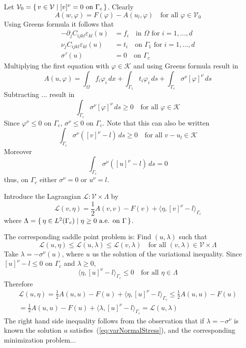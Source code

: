 \documentclass[12pt,a4paper]{article}
\numberwithin{equation}{section}
\numberwithin{table}{section}
\numberwithin{figure}{section}
\newcommand{\half}{\ensuremath{\frac{1}{2}}}
\newcommand{\pd}[1]{\ensuremath{\partial_{#1}}}
\renewcommand{\dj}{\pd{j}}
\newcommand{\V}{\ensuremath{\mathcal{V}}}
\newcommand{\K}{\ensuremath{\mathcal{K}}}
\newcommand{\Lagrange}{\ensuremath{\mathcal L}}
\newcommand{\intO}{\int_\Omega\!\!}
\newcommand{\intG}[1][0]{\int_{\Gamma_{#1}}\!\!}
\newcommand{\intGc}{\intG[c]}
\renewcommand{\epsilon}{\varepsilon}
\renewcommand{\phi}{\varphi}
\newcommand{\strain}[1][]{\ensuremath{\epsilon_{#1}}}
\newcommand{\epskl}{\strain[kl]}
\providecommand{\dualp}[2]{\langle #1, #2 \rangle}
\newcommand{\dx}{{\,dx}}
\newcommand{\ds}{{\,ds}}
\renewcommand{\forall}{\text{for all }}
\newcommand{\qforall}{\quad\text{for all }}
\begin{document}
Let $\V_0 = \set{v\in \V | [v]^\nu = 0 \text{ on }\Gamma_c}$. Clearly
\begin{equation}
  A(w,\phi) = F(\phi) - A(u_l, \phi) \quad\forall{\phi\in\V_0}
\end{equation}
Using Greens formula it follows that
\begin{align}
  \label{eq:elasteqFixedPoint}
  -\dj C_{ijkl}\epskl(u) &= f_i \quad\text{in $\Omega$ for $i=1,\ldots,d$} \\
  \nu_j C_{ijkl}\epskl(u) &= t_i \quad\text{on $\Gamma_1$ for $i=1,\ldots,d$} \\
  \sigma^\tau(u) &= 0 \quad\text{on $\Gamma_c$}
\end{align}
Multiplying the first equation with $\phi\in \K$ and using Greens formula result in
\begin{equation}
  A(u,\phi) = \intO f_i \phi_i\dx + \intG[1] t_i \phi_i \ds
  + \intGc \sigma^\nu [\phi]^\nu \ds
\end{equation}
Subtracting ... result in 
\begin{equation}
  \intGc \sigma^\nu [\phi]^\nu \ds \ge 0 \qforall \phi\in\K
\end{equation}
Since $\phi^\nu\le 0$ on $\Gamma_c$, $\sigma^\nu \le 0$ on $\Gamma_c$. Note that this can
also be written
\begin{equation}
  \intGc \sigma^\nu ([v]^\nu-l) \ds \ge 0 \qforall v-u_l\in\K
\end{equation}
Moreover
\begin{equation}
  \intGc \sigma^\nu ([u]^\nu - l) \ds = 0
\end{equation}
thus, on $\Gamma_c$ either $\sigma^\nu = 0$ or $u^\nu = l$.

Introduce the Lagrangian $\Lagrange:\V\times \Lambda$ by
\begin{equation}
  \Lagrange(v,\eta) = \half A(v,v) - F(v) + \dualp{\eta}{[v]^\nu-l}_{\Gamma_c}
\end{equation}
where $\Lambda=\set{\eta\in L^2(\Gamma_c) | \eta \ge 0 \text{ a.e. on }\Gamma}$.

The corresponding saddle point problem is: Find $(u,\lambda)$ such that
\begin{equation}
  \label{eq:SaddlePointII}  
  \Lagrange(u,\eta) \le \Lagrange(u,\lambda) \le \Lagrange(v,\lambda)
  \qforall (v,\lambda) \in \V\times\Lambda
\end{equation}
Take $\lambda = -\sigma^\nu(u)$, where $u$ us the solution of the variational inequality.
Since $[u]^\nu -l \le 0$ on $\Gamma_c$ and $\lambda \ge 0$,
\begin{equation}
  \dualp{\eta}{[u]^\nu - l}_{\Gamma_c} \le 0 \qforall \eta\in \Lambda
\end{equation}
Therefore
\begin{multline}
  \Lagrange(u,\eta) = \half A(u,u) - F(u) + \dualp{\eta}{[u]^\nu - l}_{\Gamma_c}
  \le \half A(u,u) - F(u) \\
  = \half A(u,u) - F(u) + \dualp{\lambda}{[u]^\nu - l}_{\Gamma_c}
  = \Lagrange(u,\lambda)
\end{multline}
The right hand side inequality follows from the observation that if $\lambda=-\sigma^\nu$
is known the solution $u$ satisfies~(\ref{eq:varNormalStress}), and the corresponding
minimization problem...
\end{document}
